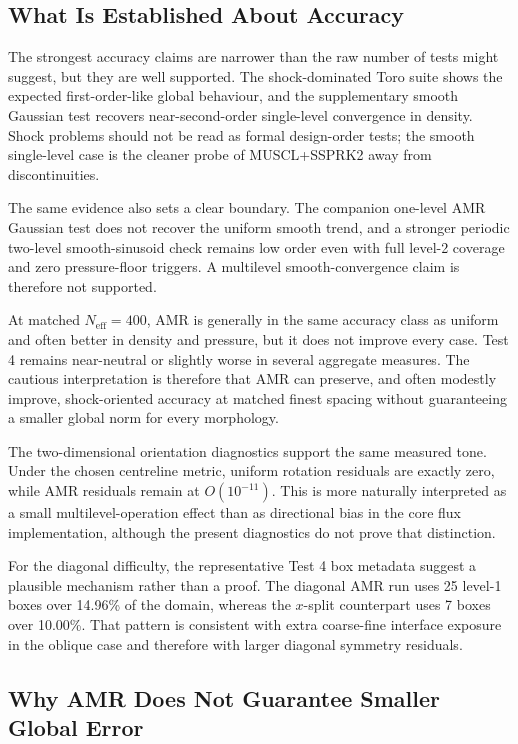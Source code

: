 \documentclass[final,3p,times,twocolumn]{elsarticle}
\begin{document}
\subsection{What Is Established About Accuracy}

The strongest accuracy claims are narrower than the raw number of tests might suggest, but they are well supported. The shock-dominated Toro suite shows the expected first-order-like global behaviour, and the supplementary smooth Gaussian test recovers near-second-order single-level convergence in density. Shock problems should not be read as formal design-order tests; the smooth single-level case is the cleaner probe of MUSCL+SSPRK2 away from discontinuities.

The same evidence also sets a clear boundary. The companion one-level AMR Gaussian test does not recover the uniform smooth trend, and a stronger periodic two-level smooth-sinusoid check remains low order even with full level-2 coverage and zero pressure-floor triggers. A multilevel smooth-convergence claim is therefore not supported.

At matched $N_\mathrm{eff}=400$, AMR is generally in the same accuracy class as uniform and often better in density and pressure, but it does not improve every case. Test 4 remains near-neutral or slightly worse in several aggregate measures. The cautious interpretation is therefore that AMR can preserve, and often modestly improve, shock-oriented accuracy at matched finest spacing without guaranteeing a smaller global norm for every morphology.

The two-dimensional orientation diagnostics support the same measured tone. Under the chosen centreline metric, uniform rotation residuals are exactly zero, while AMR residuals remain at $O(10^{-11})$. This is more naturally interpreted as a small multilevel-operation effect than as directional bias in the core flux implementation, although the present diagnostics do not prove that distinction.

For the diagonal difficulty, the representative Test 4 box metadata suggest a plausible mechanism rather than a proof. The diagonal AMR run uses 25 level-1 boxes over 14.96\% of the domain, whereas the $x$-split counterpart uses 7 boxes over 10.00\%. That pattern is consistent with extra coarse-fine interface exposure in the oblique case and therefore with larger diagonal symmetry residuals.

\subsection{Why AMR Does Not Guarantee Smaller Global Error}
\end{document}
